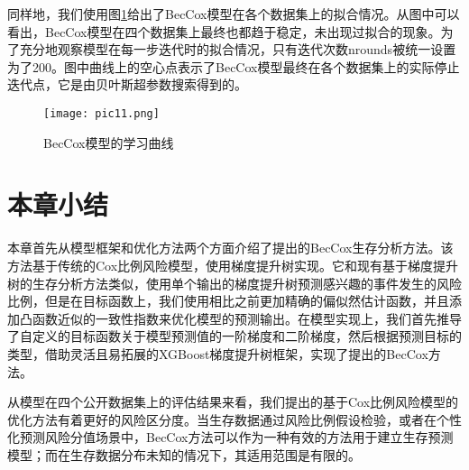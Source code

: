 同样地，我们使用图\ref{pic11}给出了BecCox模型在各个数据集上的拟合情况。从图中可以看出，BecCox模型在四个数据集上最终也都趋于稳定，未出现过拟合的现象。为了充分地观察模型在每一步迭代时的拟合情况，只有迭代次数nrounds被统一设置为了200。图中曲线上的空心点表示了BecCox模型最终在各个数据集上的实际停止迭代点，它是由贝叶斯超参数搜索得到的。

\begin{figure}[H]
\texttt{[image: pic11.png]}
\caption{BecCox模型的学习曲线}
\label{pic11}
\end{figure}

\section{本章小结}

本章首先从模型框架和优化方法两个方面介绍了提出的BecCox生存分析方法。该方法基于传统的Cox比例风险模型，使用梯度提升树实现。它和现有基于梯度提升树的生存分析方法类似，使用单个输出的梯度提升树预测感兴趣的事件发生的风险比例，但是在目标函数上，我们使用相比之前更加精确的偏似然估计函数，并且添加凸函数近似的一致性指数来优化模型的预测输出。在模型实现上，我们首先推导了自定义的目标函数关于模型预测值的一阶梯度和二阶梯度，然后根据预测目标的类型，借助灵活且易拓展的XGBoost梯度提升树框架，实现了提出的BecCox方法。

从模型在四个公开数据集上的评估结果来看，我们提出的基于Cox比例风险模型的优化方法有着更好的风险区分度。当生存数据通过风险比例假设检验，或者在个性化预测风险分值场景中，BecCox方法可以作为一种有效的方法用于建立生存预测模型；而在生存数据分布未知的情况下，其适用范围是有限的。
